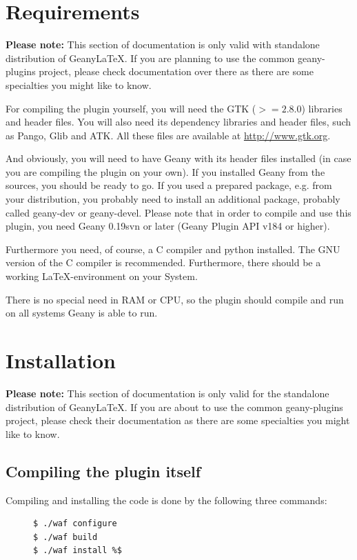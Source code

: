 \documentclass[%
paper=a4,%
fontsize=11pt,%
twoside=false,%
DIV18,
headsepline,
plainheadsepline,
footsepline,
plainfootsepline,
bibliography=totoc,%
listof=totoc,%
BCOR10mm,%
parskip=half,%
openany,%
]{scrartcl}
\begin{document}
\newpage
\section{Requirements}

\small{\textbf{Please note:} This section of documentation is only
valid with standalone distribution of Geany\LaTeX{}. If you are
planning to use the common geany-plugins project, please check
documentation over there as there are some specialties you might
like to know.}

For compiling the plugin yourself, you will need the GTK ($>= 2.8.0$)
libraries and header files. You will also need its dependency
libraries and header files, such as Pango, Glib and ATK. All these
files are available at \url{http://www.gtk.org}.

And obviously, you will need to have Geany with its header files
installed (in case you are compiling the plugin on your own). If you
installed Geany from the sources, you should be ready to go. If
you used a prepared package, e.g. from your distribution, you probably
need to install an additional package, probably called geany-dev
or geany-devel. Please note that in order to compile and use this
plugin, you need Geany 0.19svn or later (Geany Plugin API v184 or higher).

Furthermore you need, of course, a C compiler and python installed. The
GNU version of the C compiler is recommended. Furthermore, there should be a
working \LaTeX-environment on your System.

There is no special need in RAM or CPU, so the plugin should compile and
run on all systems Geany is able to run.

\section{Installation}

\small{\textbf{Please note:} This section of documentation is only
valid for the standalone distribution of Geany\LaTeX{}. If you are
about to use the common geany-plugins project, please check their
documentation as there are some specialties you might like to know.}

\subsection{Compiling the plugin itself}
Compiling and installing the code is done by the following three
commands:

\begin{figure}[h!]
\begin{lstlisting}
$ ./waf configure
$ ./waf build
$ ./waf install %$
\end{lstlisting}
\end{figure}
\end{document}
